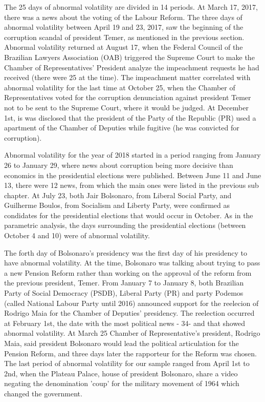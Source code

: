 \documentclass[cic,tc, english]{iiufrgs}
\begin{document}
    

    The 25 days of abnormal volatility are divided in 14 periods. At March 17, 2017, there was a news about the voting of the Labour Reform. The three days of abnormal volatility between April 19 and 23, 2017, saw the beginning of the corruption scandal of president Temer, as mentioned in the previous section. Abnormal volatility returned at August 17, when the Federal Council of the Brazilian Lawyers Association (OAB) triggered the Supreme Court to make the Chamber of Representatives' President analyze the impeachment requests he had received (there were 25 at the time). The impeachment matter correlated with abnormal volatility for the last time at October 25, when the Chamber of Representatives voted for the corruption denunciation against president Temer not to be sent to the Supreme Court, where it would be judged. At December 1st, is was disclosed that the president of the Party of the Republic (PR) used a apartment of the Chamber of Deputies while fugitive (he was convicted for corruption).

    Abnormal volatility for the year of 2018 started in a period ranging from January 26 to January 29, where news about corruption being more decisive than economics in the presidential elections were published. Between June 11 and June 13, there were 12 news, from which the main ones were listed in the previous sub chapter. At July 23, both Jair Bolsonaro, from Liberal Social Party, and Guilherme Boulos, from Socialism and Liberty Party, were confirmed as condidates for the presidential elections that would occur in October. As in the parametric analysis, the days surrounding the presidential elections (between October 4 and 10) were of abnormal volatility.

    The forth day of Bolsonaro's presidency was the first day of his presidency to have abnormal volatility. At the time, Bolsonaro was talking about trying to pass a new Pension Reform rather than working on the approval of the reform from the previous president, Temer. From January 7 to January 8, both Brazilian Party of Social Democracy (PSDB), Liberal Party (PR) and party Podemos (called National Labour Party until 2016) announced support for the reelecion of Rodrigo Maia for the Chamber of Deputies' presidency. The reelection occurred at February 1st, the date with the most political news - 34- and that showed abnormal volatility. At March 25 Chamber of Representative's president, Rodrigo Maia, said president Bolsonaro would lead the political articulation for the Pension Reform, and three days later the rapporteur for the Reform was chosen. The last period of abnormal volatility for our sample ranged from April 1st to 2nd, when the Plateau Palace, house of president Bolsonaro, share a video negating the denomination 'coup' for the military movement of 1964 which changed the government.
\end{document}
